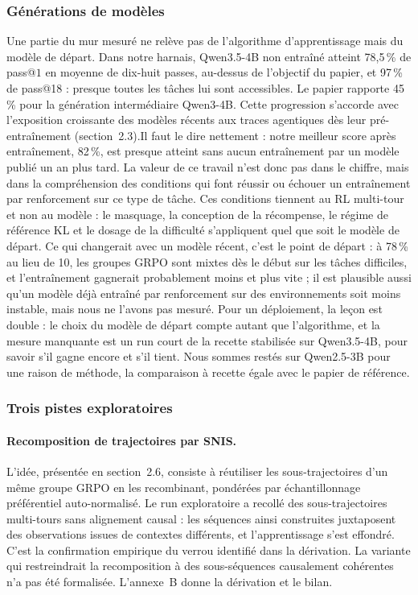 \documentclass[11pt,a4paper]{article}
\begin{document}
\subsubsection{Générations de modèles}

Une partie du mur mesuré ne relève pas de l'algorithme d'apprentissage mais du modèle de départ. Dans notre harnais, Qwen3.5-4B non entraîné atteint 78{,}5\,\% de pass@$1$ en moyenne de dix-huit passes, au-dessus de l'objectif du papier, et 97\,\% de pass@18 : presque toutes les tâches lui sont accessibles. Le papier rapporte 45\,\% pour la génération intermédiaire Qwen3-4B. Cette progression s'accorde avec l'exposition croissante des modèles récents aux traces agentiques dès leur pré-entraînement (section~2.3).Il faut le dire nettement : notre meilleur score après entraînement, 82\,\%, est presque atteint sans aucun entraînement par un modèle publié un an plus tard. La valeur de ce travail n'est donc pas dans le chiffre, mais dans la compréhension des conditions qui font réussir ou échouer un entraînement par renforcement sur ce type de tâche. Ces conditions tiennent au RL multi-tour et non au modèle : le masquage, la conception de la récompense, le régime de référence KL et le dosage de la difficulté s'appliquent quel que soit le modèle de départ. Ce qui changerait avec un modèle récent, c'est le point de départ : à 78\,\% au lieu de 10, les groupes GRPO sont mixtes dès le début sur les tâches difficiles, et l'entraînement gagnerait probablement moins et plus vite ; il est plausible aussi qu'un modèle déjà entraîné par renforcement sur des environnements soit moins instable, mais nous ne l'avons pas mesuré. Pour un déploiement, la leçon est double : le choix du modèle de départ compte autant que l'algorithme, et la mesure manquante est un run court de la recette stabilisée sur Qwen3.5-4B, pour savoir s'il gagne encore et s'il tient. Nous sommes restés sur Qwen2.5-3B pour une raison de méthode, la comparaison à recette égale avec le papier de référence.


\subsubsection{Trois pistes exploratoires}

\paragraph{Recomposition de trajectoires par SNIS.} L'idée, présentée en section~2.6, consiste à réutiliser les sous-trajectoires d'un même groupe GRPO en les recombinant, pondérées par échantillonnage préférentiel auto-normalisé. Le run exploratoire a recollé des sous-trajectoires multi-tours sans alignement causal : les séquences ainsi construites juxtaposent des observations issues de contextes différents, et l'apprentissage s'est effondré. C'est la confirmation empirique du verrou identifié dans la dérivation. La variante qui restreindrait la recomposition à des sous-séquences causalement cohérentes n'a pas été formalisée. L'annexe~B donne la dérivation et le bilan.
\end{document}
